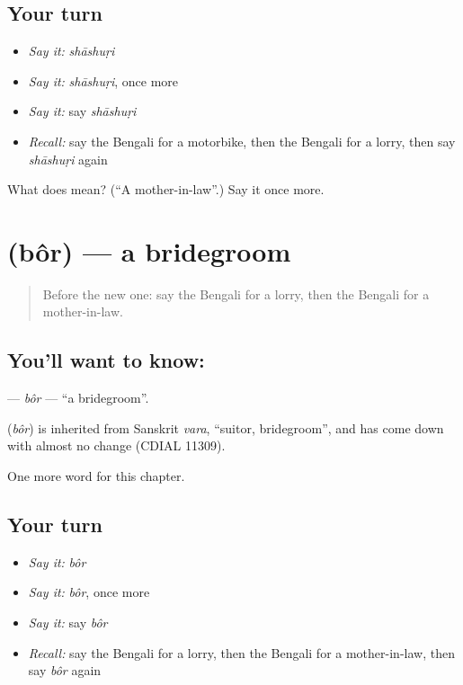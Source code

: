 \subsection*{Your turn}
\begin{itemize}
\raggedright
  \item \emph{Say it:} \emph{shāshuṛi}
  \item \emph{Say it:} \emph{shāshuṛi}, once more
  \item \emph{Say it:} say \emph{shāshuṛi}
  \item \emph{Recall:} say the Bengali for a motorbike, then the Bengali for a lorry, then say \emph{shāshuṛi} again
\end{itemize}

\begin{tcolorbox}[breakable,colback=teal!4,colframe=teal!35!black,title={Before you move on}]
What does  mean? (\textquotedblleft{}A mother-in-law\textquotedblright{}.) Say it once more.
\end{tcolorbox}
\section[\texorpdfstring{\bn{বর} (bôr)}{বর (bôr)}]{ (bôr) — a bridegroom}

\label{lesson:BN-C168-bor}



\begin{quote}
Before the new one: say the Bengali for a lorry, then the Bengali for a mother-in-law.
\end{quote}

\subsection*{You'll want to know: }
\textbf{} — \emph{bôr} — \textquotedblleft{}a bridegroom\textquotedblright{}.

\begin{cousinweb}
\textbf{} (\emph{bôr}) is inherited from Sanskrit \emph{vara}, \textquotedblleft{}suitor, bridegroom\textquotedblright{}, and has come down with almost no change (CDIAL 11309).
\end{cousinweb}

\begin{grammarlens}[title={What you've built}]
One more word for this chapter.
\end{grammarlens}

\subsection*{Your turn}
\begin{itemize}
\raggedright
  \item \emph{Say it:} \emph{bôr}
  \item \emph{Say it:} \emph{bôr}, once more
  \item \emph{Say it:} say \emph{bôr}
  \item \emph{Recall:} say the Bengali for a lorry, then the Bengali for a mother-in-law, then say \emph{bôr} again
\end{itemize}

